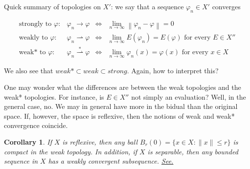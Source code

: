 \documentclass[letterpaper,twoside,11pt]{article}
\theoremstyle{mystyle}
\newtheorem{corollary}{Corollary}[theorem]
\newcommand{\cg}{\color{gray}}
\newcommand{\cbk}{\color{black}}
\begin{document}
\begin{tcolorbox}[colback=green!5!white,colframe=green!75!black]
  Quick summary of topologies on $X'$: we say that a sequence $\varphi_n \in X'$ converges 

  \[\begin{array}{*{20}{c}}
    {{\text{strongly to }}\varphi :}&{{\varphi _n} \to \varphi }& \Leftrightarrow &{\mathop {\lim }\limits_{n \to \infty } \left\| {{\varphi _n} - \varphi } \right\| = 0} \\ 
    {{\text{weakly to }}\varphi :}&{{\varphi _n} \rightharpoonup \varphi }& \Leftrightarrow &{\mathop {\lim }\limits_{n \to \infty } E\left( {{\varphi _n}} \right) = E\left( \varphi  \right){\text{ for every }}E \in X''} \\ 
    {{\text{weak* to }}\varphi :}&{{\varphi _n}\mathop  \rightharpoonup \limits^ *  \varphi}& \Leftrightarrow &{\mathop {\lim }\limits_{n \to \infty } {\varphi _n}\left( x \right) = \varphi \left( x \right){\text{ for every }}x \in X} 
  \end{array}\]

\end{tcolorbox}
We also see that $\textit{weak}*\subset \textit{weak} \subset \textit{strong}$. \cg Again, how to interpret this? \cbk

\cg One may wonder what the differences are between the weak topologies and the weak* topologies. For instance, is $E\in X''$ not simply an evaluation? Well, in the general case, no. We may in general have more in the bidual than the original space. If, however, the space is reflexive, then the notions of weak and weak* convergence coincide. \cbk

\begin{tcolorbox}[colback=gray!5!white,colframe=red!75!black]
\begin{corollary}
  If $X$ is reflexive, then any ball $B_r(0) = \{x\in X : \|x\|\leq r\}$ is compact in the weak topology. In addition, if $X$ is separable, then any bounded sequence in $X$ has a weakly convergent subsequence. \href{http://mathonline.wikidot.com/every-bounded-sequence-in-a-reflexive-space-x-has-a-weakly-c}{See.}
\end{corollary}
\end{tcolorbox}
\end{document}
